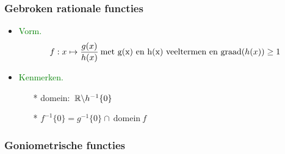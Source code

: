 \hypertarget{rationale_functies}{}
\subsubsection{Gebroken rationale functies} \label{rationale_functies}
			\begin{itemize}%
			\item\textcolor{green}{Vorm.}\newline
			\[f:x\mapsto \displaystyle\frac{\displaystyle g(x)}{\displaystyle h(x)} \:\mbox{met g(x) en h(x) veeltermen 			en graad}(h(x))\geq 1\]
			\item \textcolor{green}{Kenmerken.}\newline
				\begin{itemize}
				\item[*] domein: $\:\mathbb{R} \backslash h^{-1}\{0\}$
				\item[*] $f^{-1}\{0\}=g^{-1}\{0\}\cap \:\mbox{domein}\:f$
				\end{itemize} 
			\end{itemize}%

\hypertarget{goniometrische_functies}{}
\subsubsection{Goniometrische functies} \label{goniometrische_functies}


